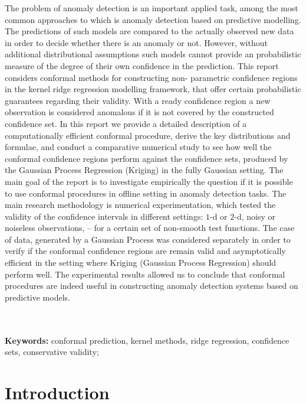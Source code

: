 \documentclass[a4paper,14pt]{extarticle}
\begin{document}
The problem of anomaly detection is an important applied task, among the most common
approaches to which is anomaly detection based on predictive modelling. The predictions 
of such models are compared to the actually observed new data in order to decide
whether there is an anomaly or not. However, without additional distributional assumptions
such models cannot provide an probabilistic measure of the degree of their own confidence
in the prediction. This report considers conformal methods for constructing non-
parametric confidence regions in the kernel ridge regression modelling framework,
that offer certain probabilistic guarantees regarding their validity. With a ready
confidence region a new observation is considered anomalous if it is not covered
by the constructed confidence set.
In this report we provide a detailed description of a computationally efficient conformal
procedure, derive the key distributions and formulae, and conduct a comparative numerical
study to see how well the conformal confidence regions perform against the confidence
sets, produced by the Gaussian Process Regression (Kriging) in the fully Gaussian
setting. The main goal of the report is to investigate empirically the question if
it is possible to use conformal procedures in offline setting in anomaly detection
tasks.
The main research methodology is numerical experimentation, which tested the validity
of the confidence intervals in different settings: $1$-d or $2$-d, noisy or noiseless
observations, -- for a certain set of non-smooth test functions. The case of data,
generated by a Gaussian Process was considered separately in order to verify if the
conformal confidence regions are remain valid and asymptotically efficient in the 
setting where Kriging (Gaussian Process Regression) should perform well.
The experimental results allowed us to conclude that conformal procedures are indeed
useful in constructing anomaly detection systems based on predictive models.

\hfill\\\hfill\\
\noindent\textbf{Keywords:} conformal prediction, kernel methods, ridge regression,
confidence sets, conservative validity;

\clearpage
{}
\tableofcontents

\clearpage
{}

\section{Introduction} %
\label{sec:introduction}
\end{document}
